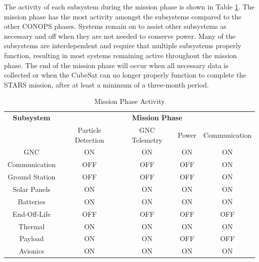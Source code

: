 The activity of each subsystem during the mission phase is shown in Table \ref{tab:on2}. The mission phase has the most activity amongst the subsystems compared to the other CONOPS phases. Systems remain on to assist other subsystems as necessary and off when they are not needed to conserve power. Many of the subsystems are interdependent and require that multiple subsystems properly function, resulting in most systems remaining active throughout the mission phase. The end of the mission phase will occur when all necessary data is collected or when the CubeSat can no longer properly function to complete the STARS mission, after at least a minimum of a three-month period.

\begin{table}[htbp]
  \centering
  \caption{Mission Phase Activity}
    \begin{tabular}{|c|c|c|c|c|}
    \hline 
    \textbf{Subsystem} & \multicolumn{4}{c|}{\textbf{Mission Phase }} \\
          & \multicolumn{1}{c}{Particle Detection } & \multicolumn{1}{c}{GNC Telemetry} & \multicolumn{1}{c}{Power} & Communication \\
    GNC   & \cellcolor[rgb]{ .573,  .816,  .314}ON & \cellcolor[rgb]{ .573,  .816,  .314}ON & \cellcolor[rgb]{ .573,  .816,  .314}ON & \cellcolor[rgb]{ .573,  .816,  .314}ON \\
 Communication & \cellcolor[rgb]{ .753,  0,  0}OFF & \cellcolor[rgb]{ .753,  0,  0}OFF & \cellcolor[rgb]{ .753,  0,  0}OFF & \cellcolor[rgb]{ .573,  .816,  .314}ON \\
   Ground Station & \cellcolor[rgb]{ .753,  0,  0}OFF & \cellcolor[rgb]{ .753,  0,  0}OFF & \cellcolor[rgb]{ .753,  0,  0}OFF & \cellcolor[rgb]{ .573,  .816,  .314}ON \\
   Solar Panels  & \cellcolor[rgb]{ .573,  .816,  .314}ON & \cellcolor[rgb]{ .573,  .816,  .314}ON & \cellcolor[rgb]{ .573,  .816,  .314}ON & \cellcolor[rgb]{ .573,  .816,  .314}ON \\
   Batteries  & \cellcolor[rgb]{ .573,  .816,  .314}ON & \cellcolor[rgb]{ .573,  .816,  .314}ON & \cellcolor[rgb]{ .573,  .816,  .314}ON & \cellcolor[rgb]{ .573,  .816,  .314}ON \\
   End-Off-Life & \cellcolor[rgb]{ .753,  0,  0}OFF & \cellcolor[rgb]{ .753,  0,  0}OFF & \cellcolor[rgb]{ .753,  0,  0}OFF & \cellcolor[rgb]{ .753,  0,  0}OFF \\
    Thermal  & \cellcolor[rgb]{ .573,  .816,  .314}ON & \cellcolor[rgb]{ .573,  .816,  .314}ON & \cellcolor[rgb]{ .573,  .816,  .314}ON & \cellcolor[rgb]{ .573,  .816,  .314}ON \\
   Payload & \cellcolor[rgb]{ .573,  .816,  .314}ON & \cellcolor[rgb]{ .573,  .816,  .314}ON & \cellcolor[rgb]{ .753,  0,  0}OFF & \cellcolor[rgb]{ .753,  0,  0}OFF \\
   Avionics & \cellcolor[rgb]{ .573,  .816,  .314}ON & \cellcolor[rgb]{ .573,  .816,  .314}ON & \cellcolor[rgb]{ .573,  .816,  .314}ON & \cellcolor[rgb]{ .573,  .816,  .314}ON \\
    \hline 
    \end{tabular}
  \label{tab:on2}
\end{table}

